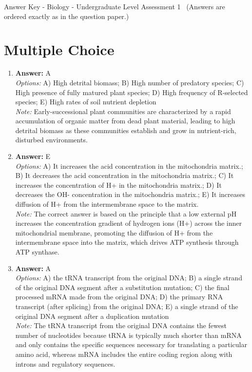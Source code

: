 \documentclass[12pt]{article}
\begin{document}
\begin{center}
Answer Key - Biology - Undergraduate Level Assessment 1 \
\small (Answers are ordered exactly as in the question paper.)
\end{center}

\section*{Multiple Choice}
\begin{enumerate}[label=\arabic*.]
\item \textbf{Answer:} A
\\ \textit{Options:} A) High detrital biomass; B) High number of predatory species; C) High presence of fully matured plant species; D) High frequency of R-selected species; E) High rates of soil nutrient depletion
\\ \textit{Note:} Early-successional plant communities are characterized by a rapid accumulation of organic matter from dead plant material, leading to high detrital biomass as these communities establish and grow in nutrient-rich, disturbed environments.
\item \textbf{Answer:} E
\\ \textit{Options:} A) It increases the acid concentration in the mitochondria matrix.; B) It decreases the acid concentration in the mitochondria matrix.; C) It increases the concentration of H+ in the mitochondria matrix.; D) It decreases the OH- concentration in the mitochondria matrix.; E) It increases diffusion of H+ from the intermembrane space to the matrix.
\\ \textit{Note:} The correct answer is based on the principle that a low external pH increases the concentration gradient of hydrogen ions (H+) across the inner mitochondrial membrane, promoting the diffusion of H+ from the intermembrane space into the matrix, which drives ATP synthesis through ATP synthase.
\item \textbf{Answer:} A
\\ \textit{Options:} A) the tRNA transcript from the original DNA; B) a single strand of the original DNA segment after a substitution mutation; C) the final processed mRNA made from the original DNA; D) the primary RNA transcript (after splicing) from the original DNA; E) a single strand of the original DNA segment after a duplication mutation
\\ \textit{Note:} The tRNA transcript from the original DNA contains the fewest number of nucleotides because tRNA is typically much shorter than mRNA and only contains the specific sequences necessary for translating a particular amino acid, whereas mRNA includes the entire coding region along with introns and regulatory sequences.

\end{enumerate}
\end{document}
